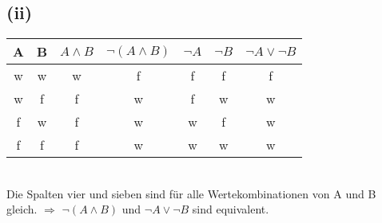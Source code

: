 \documentclass{article}
\begin{document}
    \subsection{(ii)}
    \begin{tabular}{c c c c c c c}
        A & B & \( A \land B \) & \( \lnot ( A \land B ) \) & \( \lnot A \) & \( \lnot B \) & \( \lnot A \lor \lnot B \) \\
        \midrule
        w & w & w & f & f & f & f\\
        w & f & f & w & f & w & w\\
        f & w & f & w & w & f & w\\
        f & f & f & w & w & w & w\\
    \end{tabular} \\
    Die Spalten vier und sieben sind für alle Wertekombinationen von A und B gleich.
    \( \Rightarrow \) \( \lnot ( A \land B) \) und \( \lnot A \lor \lnot B \) sind equivalent.
\end{document}
